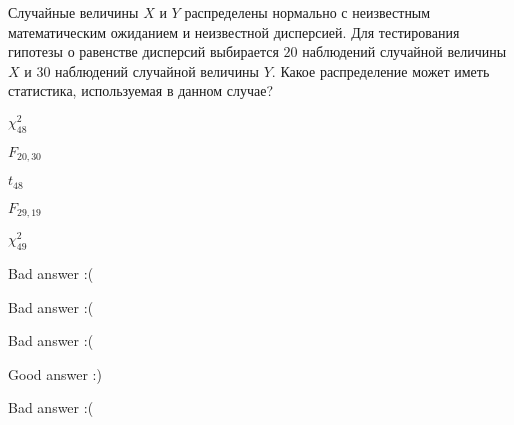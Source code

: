 
\begin{question}
Случайные величины \(X\) и \(Y\) распределены нормально с неизвестным
математическим ожиданием и неизвестной дисперсией. Для тестирования
гипотезы о равенстве дисперсий выбирается \(20\) наблюдений случайной
величины \(X\) и \(30\) наблюдений случайной величины \(Y\). Какое
распределение может иметь статистика, используемая в данном случае?
\begin{answerlist}
  \item \(\chi^2_{48}\)
  \item \(F_{20,30}\)
  \item \(t_{48}\)
  \item \(F_{29,19}\)
  \item \(\chi^2_{49}\)
\end{answerlist}
\end{question}

\begin{solution}
\begin{answerlist}
  \item Bad answer :(
  \item Bad answer :(
  \item Bad answer :(
  \item Good answer :)
  \item Bad answer :(
\end{answerlist}
\end{solution}

